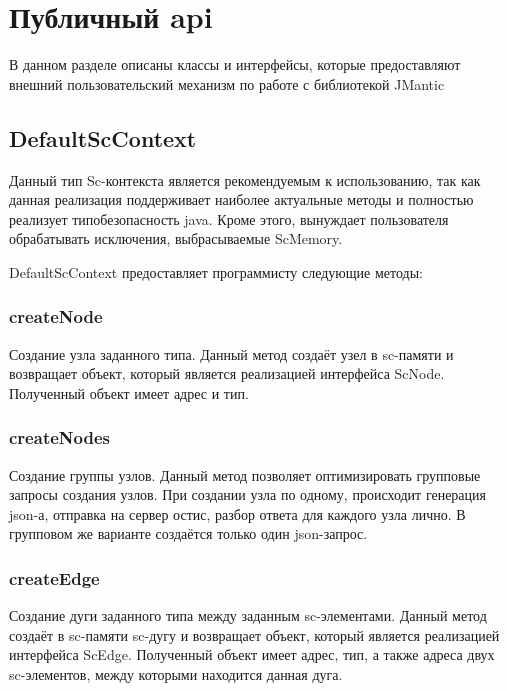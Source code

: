 \section{Публичный api}
В данном разделе описаны классы и интерфейсы, которые предоставляют внешний пользовательский механизм по работе с библиотекой JMantic


\subsection{DefaultScContext}
Данный тип Sc-контекста является рекомендуемым к использованию, так как данная реализация поддерживает наиболее актуальные методы и полностью реализует типобезопасность java. Кроме этого, вынуждает пользователя обрабатывать исключения, выбрасываемые ScMemory. 


DefaultScContext предоставляет программисту следующие методы:

\subsubsection{createNode} 

Создание узла заданного типа. Данный метод создаёт узел в sc-памяти и возвращает объект, который является реализацией интерфейса ScNode. Полученный объект имеет адрес и тип.
\subsubsection {createNodes} 

Создание группы узлов. Данный метод позволяет оптимизировать групповые запросы создания узлов. При создании узла по одному, происходит генерация json-а, отправка на сервер остис, разбор ответа для каждого узла лично. В групповом же варианте создаётся только один json-запрос. 
\subsubsection {createEdge} 

Создание дуги заданного типа между заданным sc-элементами. Данный метод создаёт в sc-памяти sc-дугу и возвращает объект, который является реализацией интерфейса ScEdge. Полученный объект имеет адрес, тип, а также адреса двух sc-элементов, между которыми находится данная дуга.
